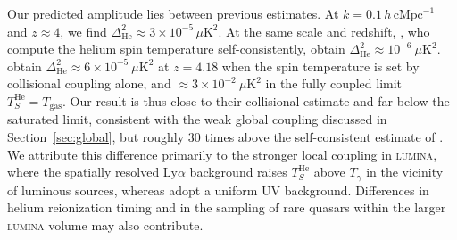 \documentclass[apj,twocolumn, appendixfloats, twocolappendix, numberedappendix, tighten]{openjournal}
\DeclareRobustCommand{\lumina}{\mbox{\textsc{lumina}}\xspace}
\begin{document}
Our predicted amplitude lies between previous estimates. At $k = 0.1\,h\,\mathrm{cMpc}^{-1}$ and $z \approx 4$, we find $\Delta^2_\mathrm{He} \approx 3\times10^{-5}\, \mu\mathrm{K}^2$. At the same scale and redshift, \citet{Spina2025}, who compute the helium spin temperature self-consistently, obtain $\Delta^2_\mathrm{He} \approx 10^{-6}\ \mu\mathrm{K}^2$. \citet{Basu2026} obtain $\Delta^2_\mathrm{He} \approx 6\times10^{-5}\ \mu\mathrm{K}^2$ at $z = 4.18$ when the spin temperature is set by collisional coupling alone, and $\approx 3\times10^{-2}\ \mu\mathrm{K}^2$ in the fully coupled limit $T_S^\mathrm{He} = T_\mathrm{gas}$. Our result is thus close to their collisional estimate and far below the saturated limit, consistent with the weak global coupling discussed in Section~\ref{sec:global}, but roughly 30 times above the self-consistent estimate of \citet{Spina2025}. We attribute this difference primarily to the stronger local coupling in \lumina, where the spatially resolved  Ly$\alpha$ background raises $T_S^\mathrm{He}$ above $T_\gamma$ in the vicinity of luminous sources, whereas \citet{Spina2025} adopt a uniform UV background. Differences in helium reionization timing and in the sampling of rare quasars within the larger \lumina volume may also contribute.




\end{document}
